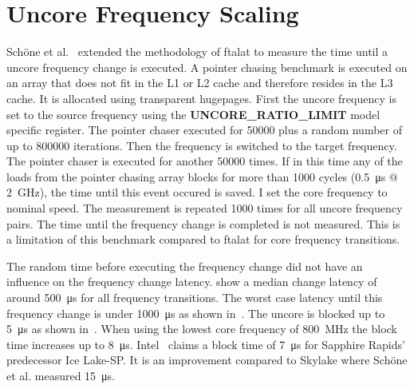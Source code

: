 \section{Uncore Frequency Scaling}
\label{sec:uncore_frequency_scaling}
Schöne et al.~\cite{Schoene_2019_SKL} extended the methodology of ftalat to measure the time until a uncore frequency change is executed.
A pointer chasing benchmark is executed on an array that does not fit in the L1 or L2 cache and therefore resides in the L3 cache.
It is allocated using transparent hugepages.
First the uncore frequency is set to the source frequency using the \textbf{UNCORE\_RATIO\_LIMIT} model specific register.
The pointer chaser executed for \SI{50000}{} plus a random number of up to \SI{800000}{} iterations.
Then the frequency is switched to the target frequency.
The pointer chaser is executed for another \SI{50000}{} times.
If in this time any of the loads from the pointer chasing array blocks for more than \SI{1000}{} cycles (\SI{0.5}{\us} @ \SI{2}{\GHz}), the time until this event occured is saved.
I set the core frequency to nominal speed.
The measurement is repeated \SI{1000}{} times for all uncore frequency pairs.
The time until the frequency change is completed is not measured.
This is a limitation of this benchmark compared to ftalat for core frequency transitions.

The random time before executing the frequency change did not have an influence on the frequency change latency.
 show a median change latency of around \SI{500}{\us} for all frequency transitions.
The worst case latency until this frequency change is under \SI{1000}{\us} as shown in~.
The uncore is blocked up to \SI{5}{\us} as shown in~.
When using the lowest core frequency of \SI{800}{\MHz} the block time increases up to \SI{8}{\us}.
Intel~\cite{Intel_2020_IceLake_SP} claims a block time of \SI{7}{\us} for Sapphire Rapids' predecessor Ice Lake-SP.
It is an improvement compared to Skylake where Schöne et al. measured \SI{15}{\us}.

